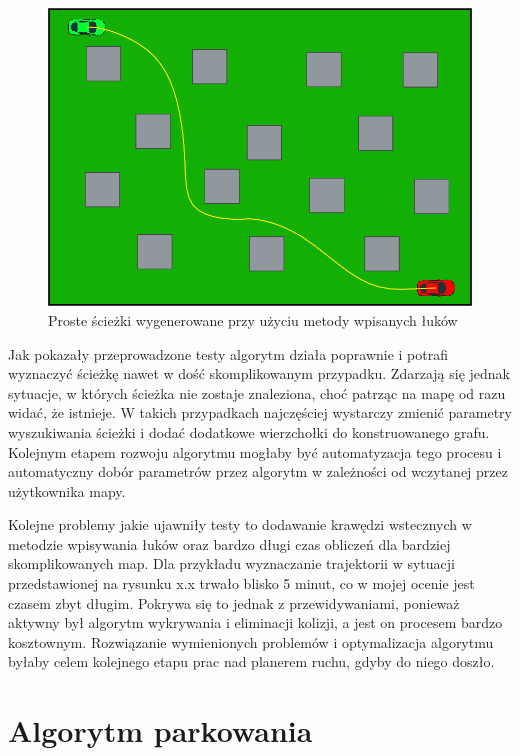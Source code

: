 \documentclass[a4paper,11pt,twoside]{report}
\theoremstyle{definition}
\begin{document}
\newpage

\begin{figure}[h!]
\centering
\includegraphics[scale=0.65]{simplePath4}
\caption[Proste ścieżki wygenerowane przy użyciu metody wpisanych łuków]{Proste ścieżki wygenerowane przy użyciu metody wpisanych łuków}
\end{figure}

Jak pokazały przeprowadzone testy algorytm działa poprawnie i potrafi wyznaczyć ścieżkę nawet w dość skomplikowanym przypadku. Zdarzają się jednak sytuacje, w których ścieżka nie zostaje znaleziona, choć patrząc na mapę od razu widać, że istnieje. W takich przypadkach najczęściej wystarczy zmienić parametry wyszukiwania ścieżki i dodać dodatkowe wierzchołki do konstruowanego grafu. Kolejnym etapem rozwoju algorytmu mogłaby być automatyzacja tego procesu i automatyczny dobór parametrów przez algorytm w zależności od wczytanej przez użytkownika mapy.

Kolejne problemy jakie ujawniły testy to dodawanie krawędzi wstecznych w metodzie wpisywania łuków oraz bardzo długi czas obliczeń dla bardziej skomplikowanych map. Dla przykładu wyznaczanie trajektorii w sytuacji przedstawionej na rysunku x.x trwało blisko 5 minut, co w mojej ocenie jest czasem zbyt długim. Pokrywa się to jednak z przewidywaniami, ponieważ aktywny był algorytm wykrywania i eliminacji kolizji, a jest on procesem bardzo kosztownym. Rozwiązanie wymienionych problemów i optymalizacja algorytmu byłaby celem kolejnego etapu prac nad planerem ruchu, gdyby do niego doszło.

\newpage

\section{Algorytm parkowania}
\end{document}
